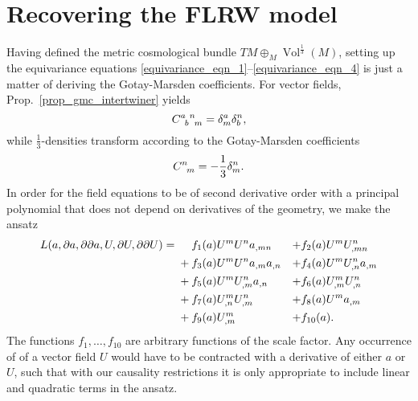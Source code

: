 \section{Recovering the FLRW model}
Having defined the metric cosmological bundle $TM \oplus_M \operatorname{Vol}^{\frac{1}{3}}(M)$, setting up the equivariance equations \eqref{equivariance_eqn_1}--\eqref{equivariance_eqn_4} is just a matter of deriving the Gotay-Marsden coefficients. For vector fields, Prop.~\ref{prop_gmc_intertwiner} yields
\begin{equation}
  \gmc{a}{b}{n}{m} = \delta^a_m \delta^n_b,
\end{equation}
while $\frac{1}{3}$-densities transform according to the Gotay-Marsden coefficients
\begin{equation}
  \gmc{}{}{n}{m} = -\frac{1}{3} \delta^n_m.
\end{equation}
In order for the field equations to be of second derivative order with a principal polynomial that does not depend on derivatives of the geometry, we make the ansatz
\begin{equation}
  \begin{aligned}
    L(a,\partial a, \partial\partial a, U, \partial U, \partial\partial U) = {} & \mathbin{\hphantom{+}} f_1(a) U^m U^n a_{,mn} & + & f_2(a) U^m U^n_{,mn} \\
    {} & + f_3(a) U^m U^n a_{,m} a_{,n} & + & f_4(a) U^m U^n_{,n} a_{,m} \\
    {} & + f_5(a) U^m U^n_{,m} a_{,n} & + & f_6(a) U^m_{,m} U^n_{,n} \\
    {} & + f_7(a) U^m_{,n} U^n_{,m} & + & f_8(a) U^m a_{,m} \\
    {} & + f_9(a) U^m_{,m} & + & f_{10}(a).
  \end{aligned}
\end{equation}
The functions $f_1,\dots, f_{10}$ are arbitrary functions of the scale factor. Any occurrence of of a vector field $U$ would have to be contracted with a derivative of either $a$ or $U$, such that with our causality restrictions it is only appropriate to include linear and quadratic terms in the ansatz.

